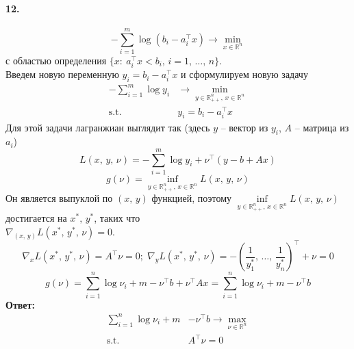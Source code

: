 \documentclass{article}
\newcommand*{\R}{\mathbb{R}}
\newcommand*{\st}{\text{s.t. }}
\newcommand*{\1}{\mathbf{1}}
\begin{document}
\paragraph{12.}
\[ -\sum\limits_{i = 1}^m \log\left(b_i - a_i^\top x\right) \to \min\limits_{x \in \R^n} \]
с областью определения $\{ x :\: a_i^\top x < b_i,\, i = 1,\, \dotsc,\, n \}$. \\
Введем новую переменную $y_i = b_i - a_i^\top x$ и сформулируем новую задачу
\[ \begin{split}
    -\sum\limits_{i = 1}^m \log y_i &\to \min\limits_{y \in \R_{++}^n,\, x \in \R^n} \\
    \st & y_i = b_i - a_i^\top x
\end{split} \]
Для этой задачи лагранжиан выглядит так (здесь $y$ -- вектор из $y_i$, $A$ -- матрица из $a_i$)
\[ L(x,\, y,\, \nu) =-\sum\limits_{i = 1}^m \log y_i + \nu^\top (y - b + Ax) \]
\[ g(\nu) = \inf\limits_{y \in \R_{++}^n,\, x \in \R^n} L(x,\, y,\, \nu) \]
Он является выпуклой по $(x,\, y)$ функцией, поэтому $\inf\limits_{y \in \R_{++}^n,\, x \in \R^n} L(x,\, y,\, \nu)$ достигается на $x^\ast,\, y^\ast$, таких что \\ $\nabla_{(x,\, y)} L(x^\ast,\, y^\ast,\, \nu) = 0$. 
\[ \nabla_x L(x^\ast,\, y^\ast,\, \nu) = A^\top \nu = 0;\; \nabla_y L(x^\ast,\, y^\ast,\, \nu) = -\left(\frac{1}{y_1^\ast},\, \dotsc,\, \frac{1}{y_n^\ast}\right)^\top + \nu = 0 \]
\[ g(\nu) = \sum\limits_{i = 1}^n \log \nu_i + m - \nu^\top b + \nu^\top A x = \sum\limits_{i = 1}^n \log \nu_i + m - \nu^\top b \]
\textbf{Ответ:}
\[ \begin{split} 
    \sum\limits_{i = 1}^n \log \nu_i + m &- \nu^\top b \to \max\limits_{\nu \in \R^n} \\
    \st & A^\top \nu = 0
\end{split} \]
\end{document}

